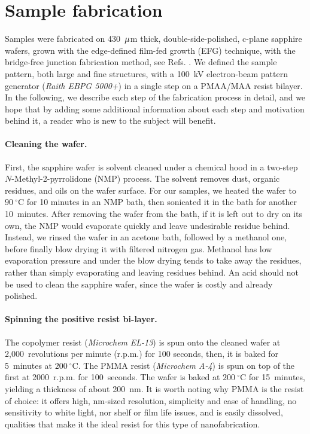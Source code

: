 \section{Sample fabrication\label{sec:Fabrication-of-sample}}

Samples were fabricated on 430~$\text{\ensuremath{\mu}}$m thick,
double-side-polished, c-plane sapphire wafers, grown with the edge-defined
film-fed growth (EFG) technique, with the bridge-free junction fabrication
method, see Refs. \citet{Lecocq2011-bridge-free,Pop2012-Junction,Pop2011-Thesis,Reagor2016}.
We defined the sample pattern, both large and fine structures, with
a 100~kV electron-beam pattern generator (\emph{Raith EBPG 5000+})
in a single step on a PMAA/MAA resist bilayer. In the following,
we describe each step of the fabrication process in detail, and we
hope that by adding some additional information about each step and
motivation behind it, a reader who is new to the subject will benefit. 

\paragraph{Cleaning the wafer. }

First, the sapphire wafer is solvent cleaned under a chemical hood
in a two-step $N$-Methyl-2-pyrrolidone (NMP) process. The solvent
removes dust, organic residues, and oils on the wafer surface. For
our samples, we heated the wafer to $90\ensuremath{~\ensuremath{^{\circ}}\text{C}}$
for 10 minutes in an NMP bath, then sonicated it in the bath for another
10~minutes. After removing the wafer from the bath, if it is left
out to dry on its own, the NMP would evaporate quickly and leave undesirable
residue behind. Instead, we rinsed the wafer in an acetone bath, followed
by a methanol one, before finally blow drying it with filtered nitrogen
gas. Methanol has low evaporation pressure and under the blow drying
tends to take away the residues, rather than simply evaporating and
leaving residues behind. An acid should not be used to clean the sapphire
wafer, since the wafer is costly and already polished.


\paragraph{Spinning the positive resist bi-layer. }

The copolymer resist (\emph{Microchem} \emph{EL-13}) is spun onto
the cleaned wafer at 2,000~revolutions per minute (r.p.m.) for 100
seconds,  then, it is baked for 5~minutes at $200~\ensuremath{^{\circ}}\text{C}$.
The PMMA resist (\emph{Microchem A-4}) is spun on top of the first
at 2000~r.p.m. for 100~seconds. The wafer is baked at $200~\ensuremath{^{\circ}}\text{C}$
for 15~minutes, yielding a thickness of about 200~nm. It is worth
noting why PMMA is the resist of choice: it offers high, nm-sized
resolution, simplicity and ease of handling, no sensitivity to white
light, nor shelf or film life issues, and is easily dissolved, qualities
that make it the ideal resist for this type of nanofabrication.

